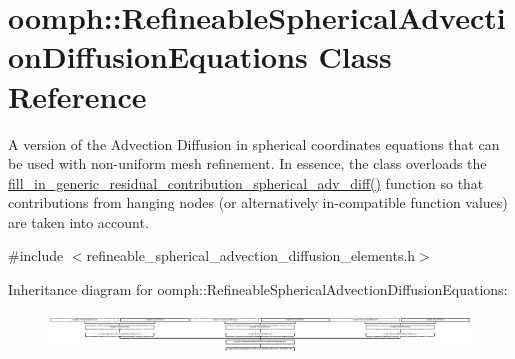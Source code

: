 \hypertarget{classoomph_1_1RefineableSphericalAdvectionDiffusionEquations}{}\section{oomph\+:\+:Refineable\+Spherical\+Advection\+Diffusion\+Equations Class Reference}
\label{classoomph_1_1RefineableSphericalAdvectionDiffusionEquations}


A version of the Advection Diffusion in spherical coordinates equations that can be used with non-\/uniform mesh refinement. In essence, the class overloads the \hyperlink{classoomph_1_1RefineableSphericalAdvectionDiffusionEquations_a08a48e0e7e544ec61f4adde6c5e41211}{fill\+\_\+in\+\_\+generic\+\_\+residual\+\_\+contribution\+\_\+spherical\+\_\+adv\+\_\+diff()} function so that contributions from hanging nodes (or alternatively in-\/compatible function values) are taken into account.  




{\ttfamily \#include $<$refineable\+\_\+spherical\+\_\+advection\+\_\+diffusion\+\_\+elements.\+h$>$}

Inheritance diagram for oomph\+:\+:Refineable\+Spherical\+Advection\+Diffusion\+Equations\+:\begin{figure}[H]
\begin{center}
\leavevmode
\includegraphics[height=1.085271cm]{classoomph_1_1RefineableSphericalAdvectionDiffusionEquations}
\end{center}
\end{figure}
